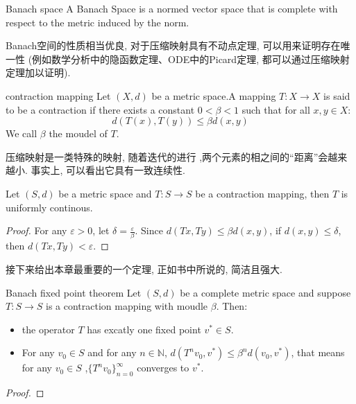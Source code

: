 \begin{definition}{Banach space}
    A Banach Space is a normed vector space that is complete with respect to the metric induced by the norm.
\end{definition}
Banach空间的性质相当优良, 对于压缩映射具有不动点定理, 可以用来证明存在唯一性
(例如数学分析中的隐函数定理、ODE中的Picard定理, 都可以通过压缩映射定理加以证明).
\begin{definition}{contraction mapping}
    Let $(X,d)$ be a metric space.A mapping $T: X \to X$ is said to be a contraction if there exists a constant $0 < \beta < 1$ such that for all $x, y \in X$:
    $$d(T(x),T(y)) \leq \beta d(x,y)$$
    We call $\beta$ the moudel of $T$.
\end{definition}
压缩映射是一类特殊的映射, 随着迭代的进行 ,两个元素的相之间的“距离”会越来越小. 事实上, 可以看出它具有一致连续性.
\begin{lemma}
    Let $(S,d)$ be a metric space and $T:S\to S$ be a contraction mapping, then $T$ is uniformly continous. 
\end{lemma}
\begin{proof}
    For any $\varepsilon>0$, let $\delta = \frac{\varepsilon}{\beta}$. 
    Since $d(Tx,Ty)\leq \beta d(x,y)$, if $d(x,y)\leq \delta$, then $d(Tx,Ty)<\varepsilon$. 
\end{proof}
\newpage

接下来给出本章最重要的一个定理, 正如书中所说的, 简洁且强大.
\begin{theorem}{Banach fixed point theorem}
    Let $(S,d)$ be a complete metric space and suppose $T:S\to S$ is a contraction mapping with moudle $\beta$. Then:
    \begin{itemize}
        \item the operator $T$ has excatly one fixed point $v^*\in S$.
        \item For any $v_0\in S$ and for any $n\in\mathbb{N}$, $d(T^nv_0,v^*)\leq \beta^nd(v_0,v^*)$, that means for any $v_0\in S$ ,$\{T^nv_0\}_{n=0}^{\infty}$ converges to $v^*$.
    \end{itemize}
\end{theorem}
\begin{proof}

\end{proof}
\newpage

